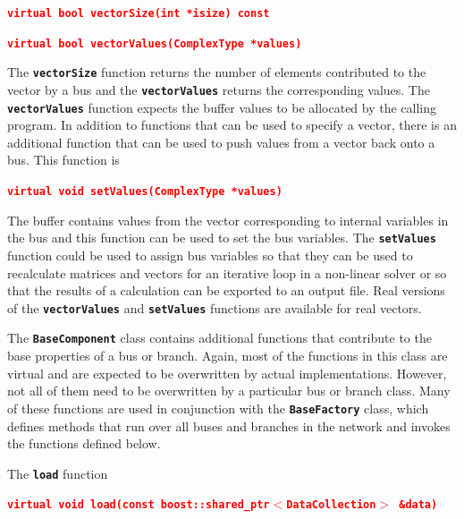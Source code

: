 \documentclass[12pt]{report} %
\begin{document}
\textcolor{red}{\texttt{\textbf{virtual bool vectorSize(int *isize) const}}}


\textcolor{red}{\texttt{\textbf{virtual bool vectorValues(ComplexType *values)}}}

The \texttt{\textbf{vectorSize}} function returns the number of elements contributed to the vector by a bus and the \texttt{\textbf{vectorValues}} returns the corresponding values. The \texttt{\textbf{vectorValues}} function expects the buffer values to be allocated by the calling program. In addition to functions that can be used to specify a vector, there is an additional function that can be used to push values from a vector back onto a bus. This function is

\textcolor{red}{\texttt{\textbf{virtual void setValues(ComplexType *values)}}}

The buffer contains values from the vector corresponding to internal variables in the bus and this function can be used to set the bus variables. The \texttt{\textbf{setValues}} function could be used to assign bus variables so that they can be used to recalculate matrices and vectors for an iterative loop in a non-linear solver or so that the results of a calculation can be exported to an output file. Real versions of the \texttt{\textbf{vectorValues}} and \texttt{\textbf{setValues}} functions are available for real vectors.

The \texttt{\textbf{BaseComponent}} class contains additional functions that contribute to the base properties of a bus or branch. Again, most of the functions in this class are virtual and are expected to be overwritten by actual implementations. However, not all of them need to be overwritten by a particular bus or branch class. Many of these functions are used in conjunction with the \texttt{\textbf{BaseFactory}} class, which defines methods that run over all buses and branches in the network and invokes the functions defined below.

The \texttt{\textbf{load}} function

\textcolor{red}{\texttt{\textbf{virtual void load(const boost::shared\_ptr$\boldsymbol{\mathrm{<}}$DataCollection$\boldsymbol{\mathrm{>}}$ \&data)}}}
\end{document}
